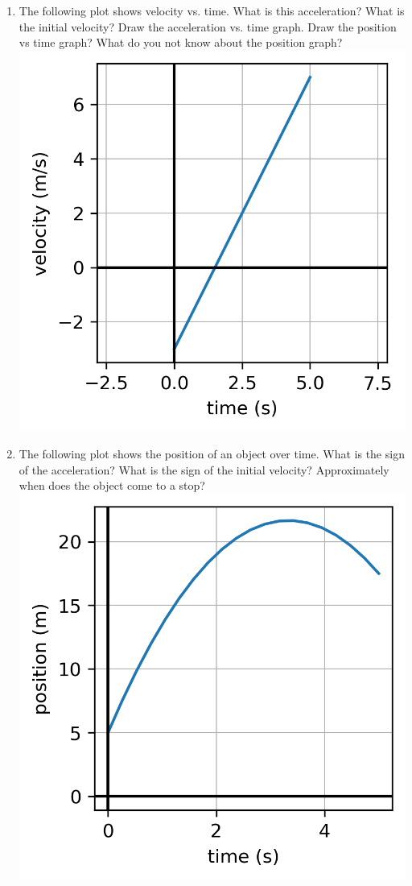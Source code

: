 \begin{enumerate}
\item The following plot shows velocity vs. time. What is this acceleration? What is the initial velocity? Draw the acceleration vs. time graph. Draw the position vs time graph? What do you not know about the position graph?\\
\includegraphics[]{week4-v1-t.png}\hugeskip



\item The following plot shows the position of an object over time. What is the sign of the acceleration? What is the sign of the initial velocity? Approximately when does the object come to a stop?\\
\includegraphics[]{week4-x1-t.png}


\end{enumerate}
